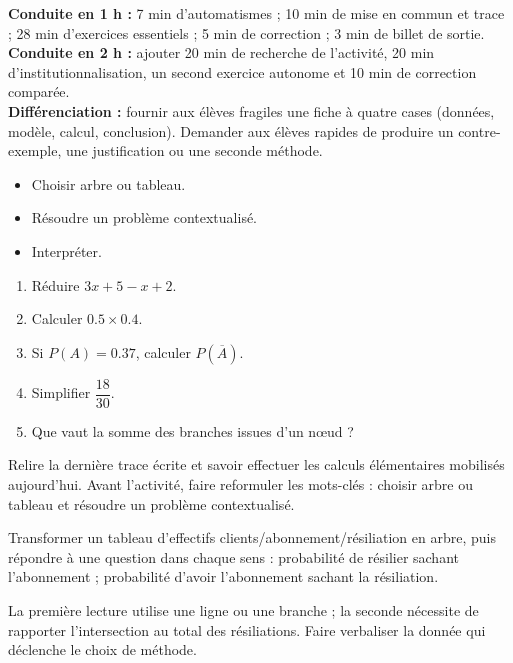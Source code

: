     \ifmxteacher
    \begin{method}
    \textbf{Conduite en 1 h :} 7 min d'automatismes ; 10 min de mise en commun et trace ; 28 min d'exercices essentiels ; 5 min de correction ; 3 min de billet de sortie.\\
    \textbf{Conduite en 2 h :} ajouter 20 min de recherche de l'activité, 20 min d'institutionnalisation, un second exercice autonome et 10 min de correction comparée.\\
    \textbf{Différenciation :} fournir aux élèves fragiles une fiche à quatre cases (données, modèle, calcul, conclusion). Demander aux élèves rapides de produire un contre-exemple, une justification ou une seconde méthode.
    \end{method}
    \fi
{}
\begin{objectives}\begin{itemize}\item Choisir arbre ou tableau.\item Résoudre un problème contextualisé.\item Interpréter.\end{itemize}\end{objectives}
\begin{fluency}\begin{enumerate}\item Réduire $3x+5-x+2$. \item Calculer $\num{0,5}\times\num{0,4}$. \item Si $P(A)=\num{0,37}$, calculer $P(\overline A)$. \item Simplifier $\dfrac{18}{30}$. \item Que vaut la somme des branches issues d'un nœud ? \end{enumerate}\end{fluency}
\begin{prerequisites}Relire la dernière trace écrite et savoir effectuer les calculs élémentaires mobilisés aujourd'hui. Avant l'activité, faire reformuler les mots-clés : choisir arbre ou tableau et résoudre un problème contextualisé.\end{prerequisites}

\begin{activity}
Transformer un tableau d'effectifs clients/abonnement/résiliation en arbre, puis répondre à une question dans chaque sens : probabilité de résilier sachant l'abonnement ; probabilité d'avoir l'abonnement sachant la résiliation.

\end{activity}
\begin{solution}La première lecture utilise une ligne ou une branche ; la seconde nécessite de rapporter l'intersection au total des résiliations. Faire verbaliser la donnée qui déclenche le choix de méthode.\end{solution}

